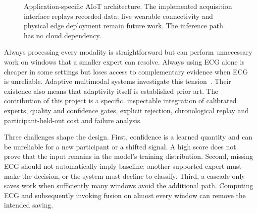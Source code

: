 \documentclass[conference,a4paper]{IEEEtran}
\begin{document}
\begin{figure}[t]
\centering
{}
\caption{Application-specific AIoT architecture. The implemented acquisition interface replays recorded data; live wearable connectivity and physical edge deployment remain future work. The inference path has no cloud dependency.}
\label{fig:context}
\end{figure}

Always processing every modality is straightforward but can perform unnecessary work on windows that a smaller expert can resolve. Always using ECG alone is cheaper in some settings but loses access to complementary evidence when ECG is unreliable. Adaptive multimodal systems investigate this tension~\cite{amser2022}. Their existence also means that adaptivity itself is established prior art. The contribution of this project is a specific, inspectable integration of calibrated experts, quality and confidence gates, explicit rejection, chronological replay and participant-held-out cost and failure analysis.

Three challenges shape the design. First, confidence is a learned quantity and can be unreliable for a new participant or a shifted signal. A high score does not prove that the input remains in the model's training distribution. Second, missing ECG should not automatically imply baseline: another supported expert must make the decision, or the system must decline to classify. Third, a cascade only saves work when sufficiently many windows avoid the additional path. Computing ECG and subsequently invoking fusion on almost every window can remove the intended saving.
\end{document}
